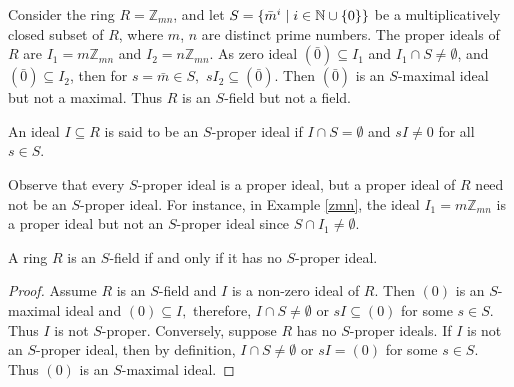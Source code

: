 \documentclass[11pt]{article}
\begin{document}
	\begin{eg}\label{zmn}
		Consider the ring $R=\mathbb{Z}_{mn}$, and let $S=\{\bar{m}^{i}\hspace{0.1cm}|\hspace{0.1cm}i\in\mathbb{N}\cup\{0\}\}$ be a multiplicatively closed subset of $R$, where $m$, $n$ are distinct prime numbers. The proper ideals of $R$ are $I_1=m\mathbb{Z}_{mn}$ and $I_2=n\mathbb{Z}_{mn}$. As zero ideal $(\bar{0})\subseteq I_1$ and $I_{1}\cap S\neq\emptyset$, and $(\bar{0})\subseteq I_2$, then for $s=\bar{m}\in S,$ $sI_{2}\subseteq (\bar{0})$. Then $(\bar{0})$ is an $S$-maximal ideal but not a maximal. Thus $R$ is an $S$-field but not a field.
	\end{eg}
	
	\begin{deff}\label{sprop}
		An ideal $I\subseteq R$ is said to be an $S$-proper ideal if $I\cap S = \emptyset$ and $sI\neq 0$ for all $s\in S.$ 
	\end{deff} 
	Observe that every $S$-proper ideal is a proper ideal, but a proper ideal of $R$ need not be an $S$-proper ideal. For instance, in Example \ref{zmn}, the ideal $I_1=m\mathbb{Z}_{mn}$ is a proper ideal but not an $S$-proper ideal since $S\cap I_1\neq \emptyset$.
	
	\begin{prop}\label{nosproper}
		A ring $R$ is an $S$-field if and only if it has no $S$-proper ideal.
	\end{prop}
	\begin{proof}
		Assume $R$ is an $S$-field and $I$ is a non-zero ideal of $R$. Then $(0)$ is an $S$-maximal ideal and $(0)\subseteq I,$ therefore, $I \cap S\neq \emptyset$ or $sI\subseteq (0)$ for some $s\in S.$ Thus $I$ is not $S$-proper. Conversely, suppose $R$ has no $S$-proper ideals. If $I$ is not an $S$-proper ideal, then by definition, $I\cap S\neq \emptyset$ or $sI=(0)$ for some $s\in S$. Thus $(0)$ is an $S$-maximal ideal.
	\end{proof}
	
\end{document}
